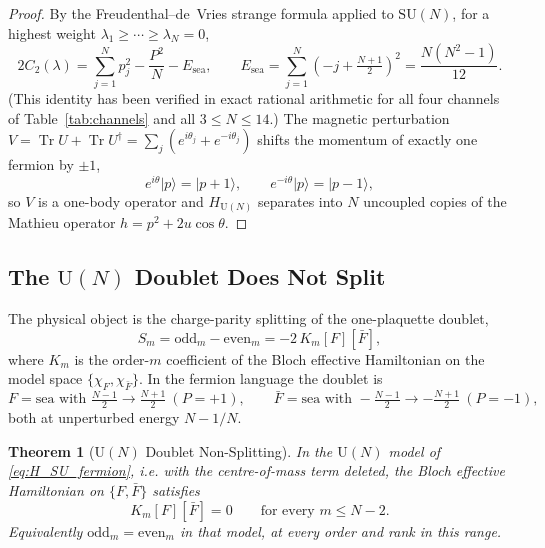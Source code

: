 \documentclass[11pt,a4paper]{article}
\newtheorem{theorem}{Theorem}[section]
\theoremstyle{definition}
\DeclareMathOperator{\Tr}{Tr}
\newcommand{\dg}{^{\dagger}}
\newcommand{\SU}{\mathrm{SU}}
\newcommand{\U}{\mathrm{U}}
\begin{document}
\begin{proof}
By the Freudenthal--de~Vries strange formula applied to $\SU(N)$, for a highest weight $\lambda_1\ge\cdots\ge\lambda_N = 0$,
\begin{equation*}
  2C_2(\lambda) = \sum_{j=1}^N p_j^2 - \frac{P^2}{N} - E_{\mathrm{sea}},
  \qquad E_{\mathrm{sea}} = \sum_{j=1}^N\left(-j + \tfrac{N+1}{2}\right)^2 = \frac{N(N^2-1)}{12} .
\end{equation*}
(This identity has been verified in exact rational arithmetic for all four channels of Table~\ref{tab:channels} and all $3\le N\le14$.) The magnetic perturbation $V = \Tr U + \Tr U\dg = \sum_j(e^{i\theta_j} + e^{-i\theta_j})$ shifts the momentum of exactly one fermion by $\pm1$,
\begin{equation*}
  e^{i\theta}|p\rangle = |p+1\rangle, \qquad e^{-i\theta}|p\rangle = |p-1\rangle,
\end{equation*}
so $V$ is a one-body operator and $H_{\U(N)}$ separates into $N$ uncoupled copies of the Mathieu operator $h = p^2 + 2u\cos\theta$.
\end{proof}

\subsection{The \texorpdfstring{$\U(N)$}{U(N)} Doublet Does Not Split}

The physical object is the charge-parity splitting of the one-plaquette doublet,
\begin{equation}\label{eq:Sm_def}
  S_m = \mathrm{odd}_m - \mathrm{even}_m = -2\,K_m[F][\bar F],
\end{equation}
where $K_m$ is the order-$m$ coefficient of the Bloch effective Hamiltonian on the model space $\{\chi_F,\chi_{\bar F}\}$. In the fermion language the doublet is
\begin{equation}
  F = \text{sea with } \tfrac{N-1}{2}\to\tfrac{N+1}{2} \ (P = +1),
  \qquad
  \bar F = \text{sea with } -\tfrac{N-1}{2}\to-\tfrac{N+1}{2} \ (P = -1),
\end{equation}
both at unperturbed energy $N - 1/N$.

\begin{theorem}[$\U(N)$ Doublet Non-Splitting]\label{thm:doublet_non_splitting}
In the $\U(N)$ model of \eqref{eq:H_SU_fermion}, i.e. with the centre-of-mass term deleted, the Bloch effective Hamiltonian on $\{F,\bar F\}$ satisfies
\begin{equation}\label{eq:Km_zero}
  K_m[F][\bar F] = 0 \qquad \text{for every } m \le N-2 .
\end{equation}
Equivalently $\mathrm{odd}_m = \mathrm{even}_m$ in that model, at every order and rank in this range.
\end{theorem}
\end{document}
